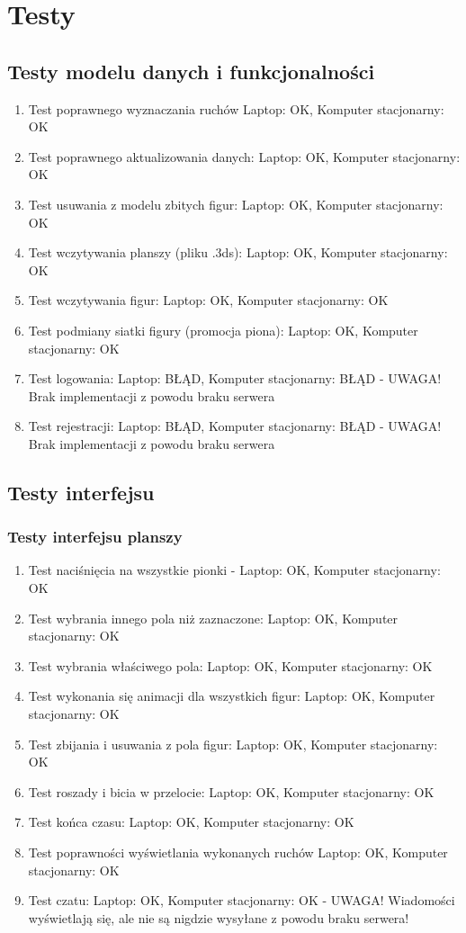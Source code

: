 \documentclass[12pt]{article}
\begin{document}
\section{Testy}
\subsection{Testy modelu danych i funkcjonalności}
\begin{enumerate}
\item Test poprawnego wyznaczania ruchów Laptop: OK, Komputer stacjonarny: OK
\item Test poprawnego aktualizowania danych: Laptop: OK, Komputer stacjonarny: OK
\item Test usuwania z modelu zbitych figur: Laptop: OK, Komputer stacjonarny: OK
\item Test wczytywania planszy (pliku .3ds): Laptop: OK, Komputer stacjonarny: OK
\item Test wczytywania figur: Laptop: OK, Komputer stacjonarny: OK
\item Test podmiany siatki figury (promocja piona): Laptop: OK, Komputer stacjonarny: OK
\item Test logowania: Laptop: BŁĄD, Komputer stacjonarny: BŁĄD - UWAGA! Brak implementacji z powodu braku serwera
\item Test rejestracji: Laptop: BŁĄD, Komputer stacjonarny: BŁĄD - UWAGA! Brak implementacji z powodu braku serwera
\end{enumerate}
\subsection{Testy interfejsu}
\subsubsection{Testy interfejsu planszy}
\begin{enumerate}
\item Test naciśnięcia na wszystkie pionki - Laptop: OK, Komputer stacjonarny: OK
\item Test wybrania innego pola niż zaznaczone: Laptop: OK, Komputer stacjonarny: OK
\item Test wybrania właściwego pola: Laptop: OK, Komputer stacjonarny: OK
\item Test wykonania się animacji dla wszystkich figur: Laptop: OK, Komputer stacjonarny: OK
\item Test zbijania i usuwania z pola figur: Laptop: OK, Komputer stacjonarny: OK
\item Test roszady i bicia w przelocie:
Laptop: OK, Komputer stacjonarny: OK
\item Test końca czasu:
Laptop: OK, Komputer stacjonarny: OK
\item Test poprawności wyświetlania wykonanych ruchów
Laptop: OK, Komputer stacjonarny: OK
\item Test czatu: Laptop: OK, Komputer stacjonarny: OK - UWAGA! Wiadomości wyświetlają się, ale nie są nigdzie wysyłane z powodu braku serwera!
\end{enumerate}
\end{document}
